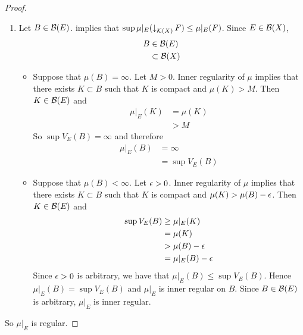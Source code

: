 \documentclass{book}
\begin{document}
\begin{proof}
\begin{enumerate}
\begin{itemize}
\begin{align*}
					& < \mu(B) + \ep \\
					& = \mu|_E(B) + \ep
				\end{align*}
				Therefore
				\begin{align*}
					\inf V_E(B)
					& \leq \mu|_E(U) \\
					& < \mu|_E(B) + \ep
				\end{align*}
				Since $\ep > 0$ is arbitrary, we have that $\inf V_E(B) \leq \mu|_E(B)$. Hence $\mu|_E(B) = \inf V_E(B)$.
			\end{itemize}
			Thus $\mu|_E$ is outer regular on $F$.
			\item Let $B \in \mathcal{B}(E)$.  implies that $\sup \mu|_E(\operatorname{\downarrow}_{\mathcal{K}(X)} F) \leq \mu|_E(F)$. Since $E \in \mathcal{B}(X)$, 
			\begin{align*}
				B
				& \in \mathcal{B}(E) \\
				& \subset \mathcal{B}(X)
			\end{align*}
			\begin{itemize}
				\item Suppose that $\mu(B) = \infty$. Let $M >0$. Inner regularity of $\mu$ implies that there exists $K \subset B$ such that $K$ is compact and $\mu(K) > M$. Then $K \in \mathcal{B}(E)$ and
				\begin{align*}
					\mu|_E(K)
					& = \mu(K) \\
					& > M
				\end{align*}
				So $\sup V_E(B) = \infty$ and therefore
				\begin{align*}
					\mu|_E(B) 
					& = \infty \\ 
					& = \sup V_E(B)
				\end{align*} 
				\item Suppose that $\mu(B) < \infty$. Let $\ep > 0$. Inner regularity of $\mu$ implies that there exists $K \subset B$ such that $K$ is compact and $\mu(K) > \mu(B) - \epsilon$. Then $K \in \mathcal{B}(E)$ and
				\begin{align*}
					\sup V_E(B)
					& \geq \mu|_E(K) \\
					& = \mu(K) \\
					& > \mu(B) - \epsilon \\
					& = \mu|_E(B) - \epsilon 
				\end{align*}
				Since $\ep >0$ is arbitrary, we have that $\mu|_E(B) \leq \sup V_E(B)$. Hence $\mu|_E(B) = \sup V_E(B)$ and $\mu|_E$ is inner regular on $B$. Since $B \in \mathcal{B}(E)$ is arbitrary, $\mu|_E$ is inner regular.
			\end{itemize}
			\end{enumerate}
			So $\mu|_E$ is regular.
	\end{proof}
\end{document}
